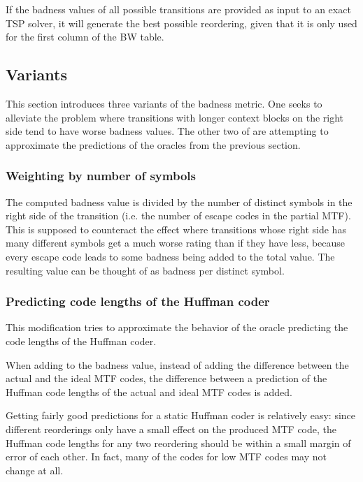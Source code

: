 \documentclass[a4paper]{scrreprt}
\begin{document}
If the badness values of all possible transitions are provided as input to an
exact TSP solver, it will generate the best possible reordering, given that it
is only used for the first column of the BW table.

\subsection{Variants}

This section introduces three variants of the badness metric. One seeks to
alleviate the problem where transitions with longer context blocks on the right
side tend to have worse badness values. The other two of are attempting to
approximate the predictions of the oracles from the previous section.

\subsubsection{Weighting by number of symbols}

The computed badness value is divided by the number of distinct symbols in the
right side of the transition (i.e. the number of escape codes in the partial
MTF). This is supposed to counteract the effect where transitions whose right
side has many different symbols get a much worse rating than if they have less,
because every escape code leads to some badness being added to the total value.
The resulting value can be thought of as badness per distinct symbol.

\subsubsection{Predicting code lengths of the Huffman coder}

This modification tries to approximate the behavior of the oracle predicting the
code lengths of the Huffman coder.

When adding to the badness value, instead of adding the difference between the
actual and the ideal MTF codes, the difference between a prediction of the
Huffman code lengths of the actual and ideal MTF codes is added.

Getting fairly good predictions for a static Huffman coder is relatively easy:
since different reorderings only have a small effect on the produced MTF code,
the Huffman code lengths for any two reordering should be within a small margin
of error of each other. In fact, many of the codes for low MTF codes may not
change at all.
\end{document}
